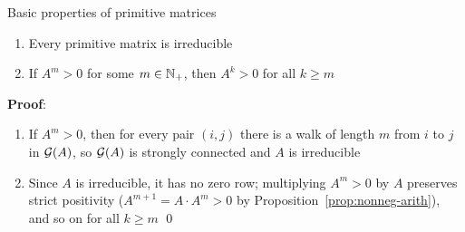 \documentclass[aspectratio=169]{beamer}\usepackage[]{graphicx}\usepackage[]{xcolor}
\begin{document}
\begin{frame}{Basic properties of primitive matrices}
\begin{proposition}
\begin{enumerate}
\item Every primitive matrix is irreducible
\item If $A^m > 0$ for some $m \in \mathbb{N}_+$, then $A^k > 0$ for all $k \ge m$
\end{enumerate}
\end{proposition}
\vfill
\textbf{Proof}:
\begin{enumerate}
\item If $A^m > 0$, then for every pair $(i, j)$ there is a walk of length $m$ from $i$ to $j$ in $\mathcal{G}(A)$, so $\mathcal{G}(A)$ is strongly connected and $A$ is irreducible
\item Since $A$ is irreducible, it has no zero row; multiplying $A^m > 0$ by $A$ preserves strict positivity ($A^{m+1} = A \cdot A^m > 0$ by Proposition~\ref{prop:nonneg-arith}), and so on for all $k \ge m$ \hfill\qed
\end{enumerate}
\end{frame}
\end{document}
